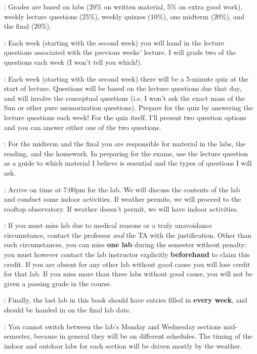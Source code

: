: Grades are based on labs (20\% on written
material, 5\% on extra good work), weekly lecture questions (25\%),
weekly quizzes (10\%), one midterm (20\%), and the final (20\%).

: Each week (starting with the second week)
you will hand in the lecture questions associated with the previous
weeks' lecture. I will grade two of the questions each week (I won't
tell you which!).

: Each week (starting with the second week)
there will be a 5-minute quiz at the start of lecture.  Questions will
be based on the lecture questions due that day, and will involve the
conceptual questions (i.e. I won't ask the exact mass of the Sun or
other pure memorization questions).  Prepare for the quiz by answering
the lecture questions each week! For the quiz itself, I'll present two
question options and you can answer either one of the two questions.

: For the midterm and the final you are
responsible for material in the labs, the reading, and the
homework. In preparing for the exams, use the lecture question as a
guide to which material I believe is essential and the types of
questions I will ask.

: Arrive on time at 7:00pm for
the lab. We will discuss the contents of the lab and conduct some
indoor activities. If weather permits, we will proceed to the rooftop
observatory. If weather doesn't permit, we will have indoor
activities.

: If you must miss lab due
to medical reasons or a truly unavoidance circumstance, contact the
professor {\it and} the TA with the justification. Other than such
circumstances, you can miss {\bf one lab} during the semester without
penalty: you must however contact the lab instructor explicitly {\bf
beforehand} to claim this credit. If you are absent for any other lab
without good cause you will lose credit for that lab.  If you miss
more than three labs without good cause, you will not be given a
passing grade in the course.

: Finally, the last lab in this book
should have entries filled in {\bf every week}, and should be handed
in on the final lab date.

: You cannot switch
between the lab's Monday and Wednesday sections mid-semester, because
in general they will be on different schedules. The timing of the
indoor and outdoor labs for each section will be driven mostly by the
weather. 

